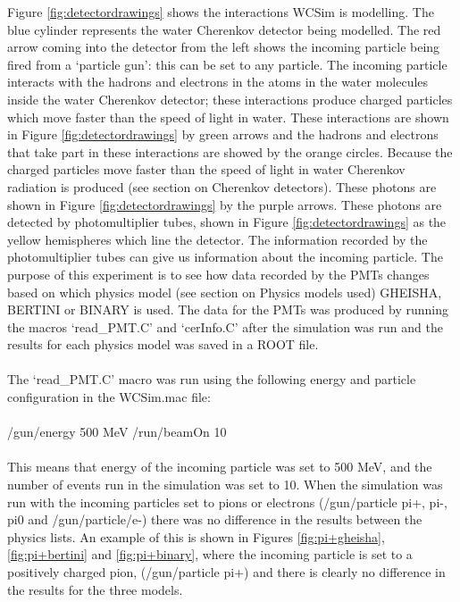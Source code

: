 \documentclass[11pt,oneside,a4paper]{article}
\begin{document}
Figure \ref{fig:detectordrawings} shows the interactions WCSim is modelling. The blue cylinder represents the water Cherenkov detector being modelled. The red arrow coming into the detector from the left shows the incoming particle being fired from a `particle gun': this can be set to any particle. The incoming particle interacts with the hadrons and electrons in the atoms in the water molecules inside the water Cherenkov detector; these interactions produce charged particles which move faster than the speed of light in water. These interactions are shown in Figure \ref{fig:detectordrawings} by green arrows and the hadrons and electrons that take part in these interactions are showed by the orange circles. Because the charged particles move faster than the speed of light in water Cherenkov radiation is produced (see section on Cherenkov detectors). These photons are shown in Figure \ref{fig:detectordrawings} by the purple arrows. These photons are detected by photomultiplier tubes, shown in Figure \ref{fig:detectordrawings} as the yellow hemispheres which line the detector. The information recorded by the photomultiplier tubes can give us information about the incoming particle. The purpose of this experiment is to see how data recorded by the PMTs changes based on which physics model (see section on Physics models used) GHEISHA, BERTINI or BINARY is used. The data for the PMTs was produced by running the macros `read\_PMT.C' and `cerInfo.C' after the simulation was run and the results for each physics model was saved in a ROOT file.
\paragraph{}
The `read\_PMT.C' macro was run using the following energy and particle configuration in the WCSim.mac file: 
\paragraph{}
/gun/energy 500 MeV
\newline \indent
/run/beamOn 10
\paragraph{}
This means that energy of the incoming particle was set to 500 MeV, and the number of events run in the simulation was set to 10. When the simulation was run with the incoming particles set to pions or electrons (/gun/particle pi+, pi-, pi0 and /gun/particle/e-) there was no difference in the results between the physics lists. An example of this is shown in Figures \ref{fig:pi+gheisha}, \ref{fig:pi+bertini} and \ref{fig:pi+binary}, where the incoming particle is set to a positively charged pion, (/gun/particle pi+) and there is clearly no difference in the results for the three models.
\end{document}
